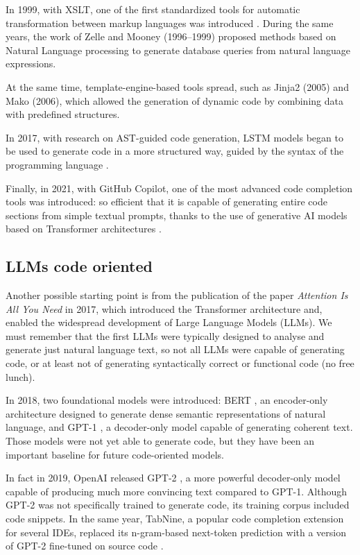 In 1999, with XSLT, one of the first standardized tools for 
automatic transformation between markup languages was introduced 
\cite{xslt1999}. During the same years, the work of Zelle\cite{zelle1996learning}
and  Mooney\cite{mooney1997nlidb} (1996–1999) 
proposed methods based on Natural Language 
processing to generate database queries from natural language 
expressions.

At the same time, template-engine-based tools spread, such as 
Jinja2 (2005)\cite{jinja2docs} and Mako (2006)\cite{makoengine}, which allowed the generation of 
dynamic code by combining data with predefined structures. 

In 2017, with research on AST-guided code generation, LSTM 
models began to be used to generate code in a more structured 
way, guided by the syntax of the programming language 
\cite{yin2017syntactic}.

Finally, in 2021, with GitHub Copilot, one of the most advanced 
code completion tools was introduced: so efficient that it is 
capable of generating entire code sections from simple textual 
prompts, thanks to the use of generative AI models based on 
Transformer architectures \cite{chen2021codex}.




\subsection{LLMs code oriented} %
Another possible starting point is from the publication of the 
paper \textit{Attention Is All You Need} in 2017, which 
introduced the Transformer architecture \cite{vaswani2017attention}
and, enabled the widespread development of
Large Language Models (LLMs). 
We must remember that the first LLMs were typically designed to 
analyse and generate just natural language text, so not all LLMs 
were capable of generating code, or at least not of 
generating syntactically correct or functional code 
(no free lunch).

In 2018, two foundational models were introduced: BERT 
\cite{devlin2019bert}, an encoder-only architecture 
designed to generate dense semantic representations of 
natural language, and GPT-1 \cite{radford2018improving}, 
a decoder-only model capable of generating coherent text. 
Those models were not yet able to generate code, but they have been 
an important baseline for future code-oriented models.

In fact in 2019, OpenAI released GPT-2 \cite{radford2019language}, 
a more powerful decoder-only model capable of producing much 
more convincing text compared to GPT-1. Although GPT-2 was 
not specifically trained to generate code, its training 
corpus included code snippets. In the same year, 
TabNine, a popular code completion extension for several IDEs, 
replaced its n-gram-based next-token prediction with a version 
of GPT-2 fine-tuned on source code \cite{tabnine2019}.


